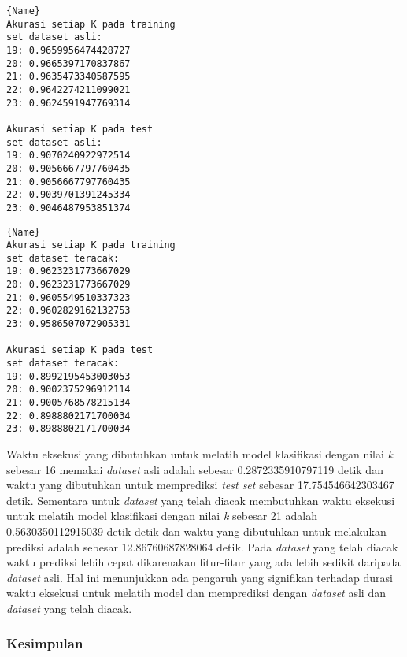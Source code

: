 \noindent\begin{minipage}{.48\textwidth}
	\begin{lstlisting}[caption=\textit{Dataset mobile\_sensor} Asli,frame=tlrb, label=mobile_sensor_akurasi_asli]{Name}
Akurasi setiap K pada training 
set dataset asli: 
19: 0.9659956474428727
20: 0.9665397170837867
21: 0.9635473340587595
22: 0.9642274211099021
23: 0.9624591947769314

Akurasi setiap K pada test 
set dataset asli: 
19: 0.9070240922972514
20: 0.9056667797760435
21: 0.9056667797760435
22: 0.9039701391245334
23: 0.9046487953851374
	\end{lstlisting}
	\end{minipage}\hfill
	\begin{minipage}{.48\textwidth}
	\begin{lstlisting}[caption=\textit{Dataset mobile\_sensor} Teracak,frame=tlrb, label=mobile_sensor_akurasi_randomisasi]{Name}
Akurasi setiap K pada training 
set dataset teracak: 
19: 0.9623231773667029
20: 0.9623231773667029
21: 0.9605549510337323
22: 0.9602829162132753
23: 0.9586507072905331

Akurasi setiap K pada test 
set dataset teracak: 
19: 0.8992195453003053
20: 0.9002375296912114
21: 0.9005768578215134
22: 0.8988802171700034
23: 0.8988802171700034
	\end{lstlisting}
\end{minipage}

Waktu eksekusi yang dibutuhkan untuk melatih model klasifikasi dengan nilai \textit{k} sebesar 16 memakai \textit{dataset} asli adalah sebesar 0.2872335910797119 detik dan waktu yang dibutuhkan untuk memprediksi \textit{test set} sebesar 17.754546642303467 detik. Sementara untuk \textit{dataset} yang telah diacak membutuhkan waktu eksekusi untuk melatih model klasifikasi dengan nilai \textit{k} sebesar 21 adalah 0.5630350112915039 detik detik dan waktu yang dibutuhkan untuk melakukan prediksi adalah sebesar 12.86760687828064 detik. Pada \textit{dataset} yang telah diacak waktu prediksi lebih cepat dikarenakan fitur-fitur yang ada lebih sedikit daripada \textit{dataset} asli. Hal ini menunjukkan ada pengaruh yang signifikan terhadap durasi waktu eksekusi untuk melatih model dan memprediksi dengan \textit{dataset} asli dan \textit{dataset} yang telah diacak.

\subsubsection{Kesimpulan}
\label{subsubsec:pengujian-klasifikasi-kesimpulan}

